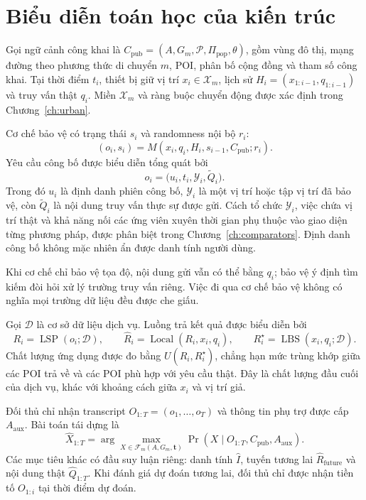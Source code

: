 \documentclass[12pt,a4paper,oneside]{report}
\begin{document}
\section{Biểu diễn toán học của kiến trúc}

Gọi ngữ cảnh công khai là $C_{\mathrm{pub}}=(A,G_m,\mathcal P,\Pi_{\mathrm{pop}},\theta)$, gồm vùng đô thị, mạng đường theo phương thức di chuyển $m$, POI, phân bố cộng đồng và tham số công khai. Tại thời điểm $t_i$, thiết bị giữ vị trí $x_i\in\mathcal X_m$, lịch sử $H_i=(x_{1:i-1},q_{1:i-1})$ và truy vấn thật $q_i$. Miền $\mathcal X_m$ và ràng buộc chuyển động được xác định trong Chương~\ref{ch:urban}.

Cơ chế bảo vệ có trạng thái $s_i$ và randomness nội bộ $r_i$:
\[
(o_i,s_i)=M(x_i,q_i,H_i,s_{i-1},C_{\mathrm{pub}};r_i).
\]
Yêu cầu công bố được biểu diễn tổng quát bởi
\[
o_i=\bigl(u_i,t_i,\mathcal Y_i,\widetilde Q_i\bigr).
\]
Trong đó $u_i$ là định danh phiên công bố, $\mathcal Y_i$ là một vị trí hoặc tập vị trí đã bảo vệ, còn $\widetilde Q_i$ là nội dung truy vấn thực sự được gửi. Cách tổ chức $\mathcal Y_i$, việc chứa vị trí thật và khả năng nối các ứng viên xuyên thời gian phụ thuộc vào giao diện từng phương pháp, được phân biệt trong Chương~\ref{ch:comparators}. Định danh công bố không mặc nhiên ẩn được danh tính người dùng.

Khi cơ chế chỉ bảo vệ tọa độ, nội dung gửi vẫn có thể bằng $q_i$; bảo vệ ý định tìm kiếm đòi hỏi xử lý trường truy vấn riêng. Việc đi qua cơ chế bảo vệ không có nghĩa mọi trường dữ liệu đều được che giấu.

Gọi $\mathcal D$ là cơ sở dữ liệu dịch vụ. Luồng trả kết quả được biểu diễn bởi
\[
R_i=\operatorname{LSP}(o_i;\mathcal D),\qquad
\widehat R_i=\operatorname{Local}(R_i,x_i,q_i),\qquad
R_i^\star=\operatorname{LBS}(x_i,q_i;\mathcal D).
\]
Chất lượng ứng dụng được đo bằng $U(\widehat R_i,R_i^\star)$, chẳng hạn mức trùng khớp giữa các POI trả về và các POI phù hợp với yêu cầu thật. Đây là chất lượng đầu cuối của dịch vụ, khác với khoảng cách giữa $x_i$ và vị trí giả.

Đối thủ chỉ nhận transcript $O_{1:T}=(o_1,\ldots,o_T)$ và thông tin phụ trợ được cấp $A_{\mathrm{aux}}$. Bài toán tái dựng là
\[
\widehat X_{1:T}
=\arg\max_{X\in\mathcal F_m(A,G_m,\mathbf t)}
\Pr(X\mid O_{1:T},C_{\mathrm{pub}},A_{\mathrm{aux}}).
\]
Các mục tiêu khác có đầu suy luận riêng: danh tính $\widehat I$, tuyến tương lai $\widehat R_{\mathrm{future}}$ và nội dung thật $\widehat Q_{1:T}$. Khi đánh giá dự đoán tương lai, đối thủ chỉ được nhận tiền tố $O_{1:i}$ tại thời điểm dự đoán.
\end{document}
